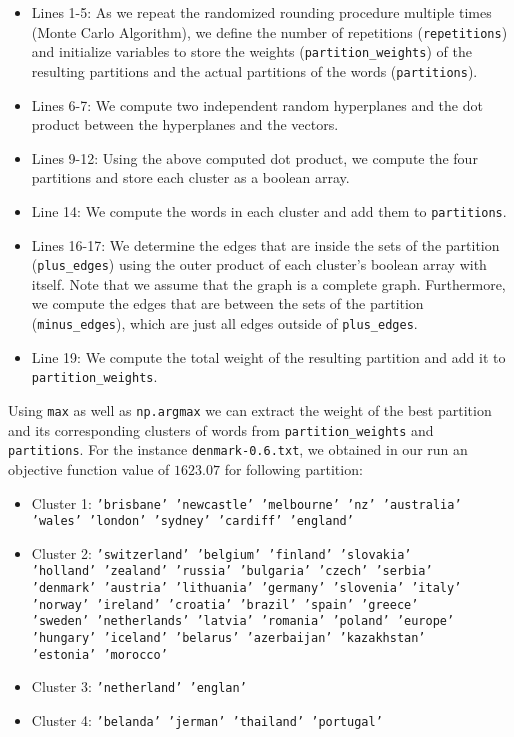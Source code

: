 \documentclass{article}
\begin{document}
\begin{itemize}
    \item Lines 1-5: As we repeat the randomized rounding procedure multiple times (Monte Carlo Algorithm), we define the number of repetitions (\lstinline|repetitions|) and initialize variables to store the weights (\lstinline|partition_weights|) of the resulting partitions and the actual partitions of the words (\lstinline|partitions|).
    \item Lines 6-7: We compute two independent random hyperplanes and the dot product between the hyperplanes and the vectors.
    \item Lines 9-12: Using the above computed dot product, we compute the four partitions and store each cluster as a boolean array.
    \item Line 14: We compute the words in each cluster and add them to \lstinline|partitions|.
    \item Lines 16-17: We determine the edges that are inside the sets of the partition (\lstinline|plus_edges|) using the outer product of each cluster's boolean array with itself. Note that we assume that the graph is a complete graph. Furthermore, we compute the edges that are between the sets of the partition (\lstinline|minus_edges|), which are just all edges outside of \lstinline|plus_edges|.
    \item Line 19: We compute the total weight of the resulting partition and add it to \lstinline|partition_weights|.
\end{itemize}

Using \lstinline|max| as well as \lstinline|np.argmax| we can extract the weight of the best partition and its corresponding clusters of words from \lstinline|partition_weights| and \lstinline|partitions|. For the instance \texttt{denmark-0.6.txt}, we obtained in our run an objective function value of $1623.07$ for following partition:
\begin{itemize}
    \item Cluster 1: \texttt{'brisbane' 'newcastle' 'melbourne' 'nz' 'australia' 'wales' 'london'
 'sydney' 'cardiff' 'england'}
    \item Cluster 2: \texttt{'switzerland' 'belgium' 'finland' 'slovakia' \\'holland' 'zealand' 'russia'
 'bulgaria' 'czech' 'serbia' \\'denmark' 'austria' 'lithuania' 'germany'
 'slovenia' 'italy' \\'norway' 'ireland' 'croatia' 'brazil' 'spain' 'greece'
 \\'sweden' 'netherlands' 'latvia' 'romania' 'poland' 'europe' \\'hungary'
 'iceland' 'belarus' 'azerbaijan' 'kazakhstan' \\'estonia' 'morocco'}
    \item Cluster 3: \texttt{'netherland' 'englan'}
    \item Cluster 4: \texttt{'belanda' 'jerman' 'thailand' 'portugal'}
\end{itemize}
\end{document}
